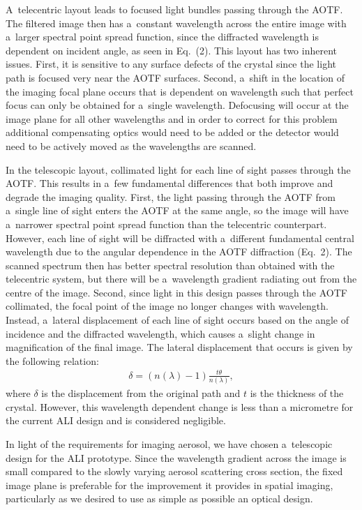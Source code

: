 \documentclass[amt]{copernicus}
\begin{document}
A~telecentric layout leads to focused light bundles passing through
the AOTF. The filtered image then has a~constant wavelength across the
entire image with a~larger spectral point spread function, since the
diffracted wavelength is dependent on incident angle, as seen in
Eq.~(2). This layout has two inherent issues. First, it is sensitive
to any surface defects of the crystal since the light path is focused
very near the AOTF surfaces. Second, a~shift in the location of the
imaging focal plane occurs that is dependent on wavelength such that
perfect focus can only be obtained for a~single wavelength. Defocusing
will occur at the image plane for all other wavelengths and in order
to correct for this problem additional compensating optics would need
to be added or the detector would need to be actively moved as the
wavelengths are scanned.\hack{\newpage}




In the telescopic layout, collimated light for each line of sight
passes through the AOTF. This results in a~few fundamental differences
that both improve and degrade the imaging quality. First, the light
passing through the AOTF from a~single line of sight enters the AOTF
at the same angle, so the image will have a~narrower spectral point
spread function than the telecentric counterpart. However, each
line of sight will be diffracted with a~different fundamental central
wavelength due to the angular dependence in the AOTF diffraction
(Eq.~2). The scanned spectrum then has better spectral resolution than
obtained with the telecentric system, but there will be a~wavelength
gradient radiating out from the centre of the image.  Second, since
light in this design passes through the AOTF collimated, the focal
point of the image no longer changes with wavelength. Instead,
a~lateral displacement of each line of sight occurs based on the angle
of incidence and the diffracted wavelength, which causes a~slight
change in magnification of the final image. The lateral displacement
that occurs is given by the following relation:
\begin{align}
\delta =\left(n\left(\lambda \right)-1 \right)\frac{t\theta} {n(\lambda)},
\end{align}
where $\delta$ is the displacement from the original path and $t$ is the
thickness of the crystal. However, this wavelength
dependent change is less than a micrometre for the current ALI design and is considered negligible.

In light of the requirements for imaging aerosol, we have chosen
a~telescopic design for the ALI prototype. Since the wavelength
gradient across the image is small compared to the slowly varying
aerosol scattering cross section, the fixed image plane is preferable
for the improvement it provides in spatial imaging, particularly as we
desired to use as simple as possible an optical design.
\end{document}
